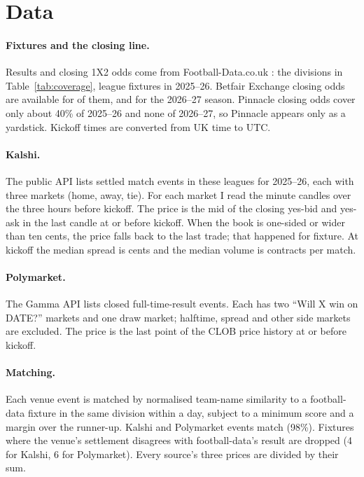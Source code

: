 \documentclass[11pt]{article}
\begin{document}
\section{Data}\label{sec:data}

\paragraph{Fixtures and the closing line.} Results and closing 1X2 odds come from
Football-Data.co.uk \citep{footballdata}: the \nLeagues{} divisions in Table~\ref{tab:coverage},
\nFixtures{} league fixtures in 2025--26. Betfair Exchange closing odds are available for
\nBetfair{} of them, and for the 2026--27 season. Pinnacle closing odds cover only about 40\% of
2025--26 and none of 2026--27, so Pinnacle appears only as a yardstick. Kickoff times are
converted from UK time to UTC.

\paragraph{Kalshi.} The public API lists \nKalshiEvents{} settled match events in these leagues
for 2025--26, each with three markets (home, away, tie). For each market I read the minute
candles over the three hours before kickoff. The price is the mid of the closing yes-bid and
yes-ask in the last candle at or before kickoff. When the book is one-sided or wider than ten
cents, the price falls back to the last trade; that happened for \kFallback{} fixture. At kickoff
the median spread is \kSpread{} cents and the median volume is \kVolume{} contracts per match.

\paragraph{Polymarket.} The Gamma API lists \nPmEvents{} closed full-time-result events. Each has
two ``Will X win on DATE?'' markets and one draw market; halftime, spread and other side markets
are excluded. The price is the last point of the CLOB price history at or before kickoff.

\paragraph{Matching.} Each venue event is matched by normalised team-name similarity to a
football-data fixture in the same division within a day, subject to a minimum score and a margin
over the runner-up. \nKalshiMatched{} Kalshi and \nPmMatched{} Polymarket events match (98\%).
Fixtures where the venue's settlement disagrees with football-data's result are dropped (4 for
Kalshi, 6 for Polymarket). Every source's three prices are divided by their sum.
\end{document}

